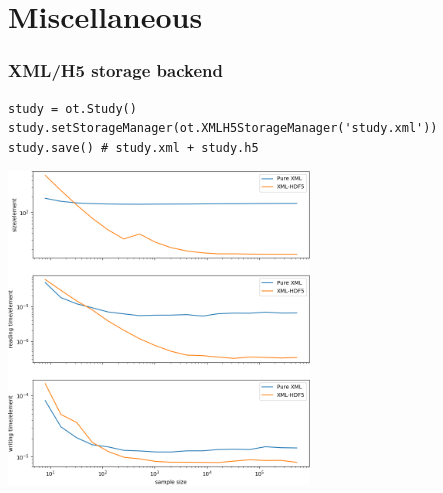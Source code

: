 \documentclass{beamer}
\begin{document}
% 
% 
% 
% 

\section{Miscellaneous}

\begin{frame}[containsverbatim]
\frametitle{XML/H5 storage backend}
\lstset{language=python}

\begin{lstlisting}
study = ot.Study()
study.setStorageManager(ot.XMLH5StorageManager('study.xml'))
study.save() # study.xml + study.h5
\end{lstlisting}

\begin{center}
\includegraphics[width=0.6\textwidth]{figures/xmlh5.png}
\end{center}

\end{frame}

\end{document}

